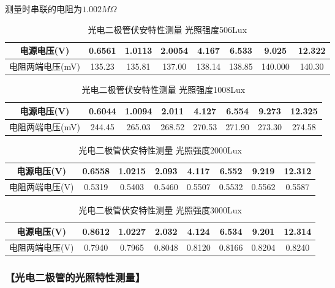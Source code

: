 \documentclass{ctexart}
\let\oldsubsubsection\subsubsection
\renewcommand{\subsubsection}[1]{\oldsubsubsection{\!\!\!\!\!\!【#1】}}
\begin{document}
测量时串联的电阻为$1.002M\Omega$

\begin{table*}[!htbp]
  \centering
  \begin{tabular}{|c|c|c|c|c|c|c|c|}
    \hline
    电源电压(V) &0.6561&1.0113&2.0054&4.167&6.533&9.025&12.322\\\hline
    电阻两端电压(mV) &135.23&135.81&137.00&138.14&138.85&140.000&140.30\\\hline
  \end{tabular}
  \caption{光电二极管伏安特性测量 光照强度506Lux}
\end{table*}

\begin{table*}[!htbp]
  \centering
  \begin{tabular}{|c|c|c|c|c|c|c|c|}
    \hline
    电源电压(V) &0.6044&1.0094&2.011&4.127&6.554&9.273&12.325\\\hline
    电阻两端电压(mV) &244.45&265.03&268.52&270.53&271.90&273.30&274.58\\\hline
  \end{tabular}
  \caption{光电二极管伏安特性测量 光照强度1008Lux}
\end{table*}

\begin{table*}[!htbp]
  \centering
  \begin{tabular}{|c|c|c|c|c|c|c|c|}
    \hline
    电源电压(V) &0.6558&1.0215&2.093&4.117&6.552&9.219&12.312\\\hline
    电阻两端电压(V) &0.5319&0.5403&0.5460&0.5507&0.5532&0.5562&0.5587\\\hline
  \end{tabular}
  \caption{光电二极管伏安特性测量 光照强度2000Lux}
\end{table*}

\begin{table*}[!htbp]
  \centering
  \begin{tabular}{|c|c|c|c|c|c|c|c|}
    \hline
    电源电压(V) &0.8612&1.0227&2.032&4.124&6.534&9.201&12.314\\\hline
    电阻两端电压(V) &0.7940&0.7965&0.8048&0.8120&0.8166&0.8204&0.8240\\\hline
  \end{tabular}
  \caption{光电二极管伏安特性测量 光照强度3000Lux}
\end{table*}

\subsubsection{光电二极管的光照特性测量}
\end{document}
